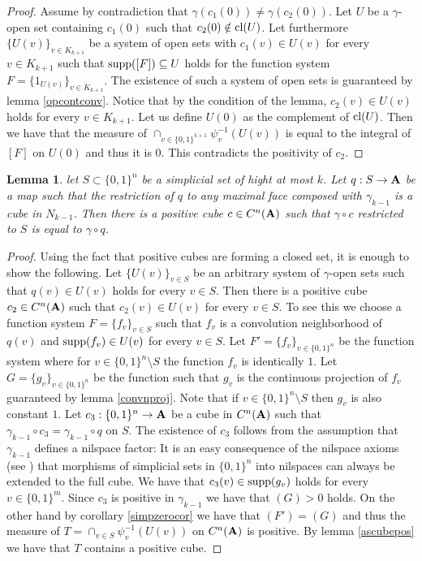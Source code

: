\documentclass [11pt] {article}
\newtheorem{lemma}{Lemma}[section]
\def\cl{{\rm cl}}
\def\bA{{\bf A}}
\begin{document}
\begin{proof} Assume by contradiction that $\gamma(c_1(0))\neq \gamma(c_2(0))$. Let $U$ be a $\gamma$-open set containing $c_1(0)$ such that $c_2(0)\notin\cl(U)$. Let furthermore $\{U(v)\}_{v\in K_{k+1}}$ be a system of open sets with $c_1(v)\in U(v)$ for every $v\in K_{k+1}$ such that ${\rm supp}([F])\subseteq U$ holds for the function system $F=\{1_{U(v)}\}_{v\in K_{k+1}}$. The existence of such a system of open sets is guaranteed by lemma \ref{opcontconv}. Notice that by the condition of the lemma, $c_2(v)\in U(v)$ holds for every $v\in K_{k+1}$. Let us define $U(0)$ as the complement of $\cl(U)$. Then we have that the measure of $\cap_{v\in\{0,1\}^{k+1}}\psi_v^{-1}(U(v))$ is equal to the integral of $[F]$ on $U(0)$ and thus it is $0$. This contradicts the positivity of $c_2$.
\end{proof}

\begin{lemma}\label{simpglpos} let $S\subset\{0,1\}^n$ be a simplicial set of hight at most $k$. Let $q:S\rightarrow \bA$ be a map such that the restriction of $q$ to any maximal face composed with $\gamma_{k-1}$ is a cube in $N_{k-1}$. Then there is a positive cube $c\in C^n(\bA)$ such that $\gamma\circ c$ restricted to $S$ is equal to $\gamma\circ q$. 
\end{lemma}

\begin{proof} Using the fact that positive cubes are forming a closed set, it is enough to show the following. Let $\{U(v)\}_{v\in S}$ be an arbitrary system of $\gamma$-open sets such that $q(v)\in U(v)$ holds for every $v\in S$. Then there is a positive cube $c_2\in C^n(\bA)$ such that $c_2(v)\in U(v)$ for every $v\in S$.
 To see this we choose a function system $F=\{f_v\}_{v\in S}$ such that $f_v$ is a convolution neighborhood of $q(v)$ and ${\rm supp}(f_v)\in U(v)$ for every $v\in S$. Let $F'=\{f_v\}_{v\in\{0,1\}^n}$ be the function system where for $v\in \{0,1\}^n\setminus S$ the function $f_v$ is identically $1$. Let $G=\{g_v\}_{v\in\{0,1\}^n}$ be the function such that $g_v$ is the continuous projection of $f_v$ guaranteed by lemma \ref{convnproj}. Note that if $v\in\{0,1\}^n\setminus S$ then $g_v$ is also constant $1$.
Let $c_3:\{0,1\}^n\rightarrow\bA$ be a cube in $C^n(\bA)$ such that $\gamma_{k-1}\circ c_3=\gamma_{k-1}\circ q$ on $S$. The existence of $c_3$ follows from the assumption that $\gamma_{k-1}$ defines a nilspace factor: It is an easy consequence of the nilspace axioms (see \cite{NP}) that morphisms of simplicial sets in $\{0,1\}^n$ into nilspaces can always be extended to the full cube.  
We have that $c_3(v)\in{\rm supp}(g_v)$ holds for every $v\in\{0,1\}^m$. Since $c_3$ is positive in $\gamma_{k-1}$ we have that $(G)>0$ holds. On the other hand by corollary \ref{simpzerocor} we have that $(F')=(G)$ and thus the measure of $T=\cap_{v\in S}\psi_v^{-1}(U(v))$ on $C^n(\bA)$ is positive. By lemma \ref{ascubepos} we have that $T$ contains a positive cube. 
\end{proof}
\end{document}
